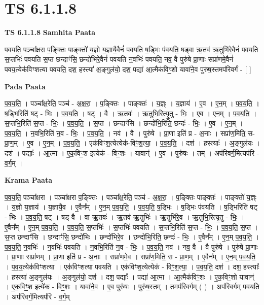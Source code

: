 \documentclass[17pt]{extarticle}
\begin{document}
\section{ TS 6.1.1.8 }

\textbf{TS 6.1.1.8 } \newline
\textbf{Samhita Paata} \newline

पवयति॒ पञ्चा᳚क्षरा प॒ङ्क्तिः पाङ्क्तो॑ य॒ज्ञो य॒ज्ञायै॒वैनं॑ पवयति ष॒ड्भिः प॑वयति॒ षड्वा ऋ॒तव॑ ऋ॒तुभि॑रे॒वैनं॑ पवयति स॒प्तभिः॑ पवयति स॒प्त छन्दाꣳ॑सि॒ छन्दो॑भिरे॒वैनं॑ पवयति न॒वभिः॑ पवयति॒ नव॒ वै पुरु॑षे प्रा॒णाः सप्रा॑णमे॒वैनं॑ पवय॒त्येक॑विꣳशत्या पवयति॒ दश॒ हस्त्या॑ अ॒ङ्गुल॑यो॒ दश॒ पद्या॑ आ॒त्मैक॑विꣳ॒॒शो यावा॑ने॒व पुरु॑ष॒स्तमप॑रिवर्गं - [  ] \newline

\textbf{Pada Paata} \newline

प॒व॒य॒ति॒ । पञ्चा᳚क्ष॒रेति॒ पञ्च॑ - अ॒क्ष॒रा॒ । प॒ङ्क्तिः । पाङ्क्तः॑ । य॒ज्ञ्ः । य॒ज्ञाय॑ । ए॒व । ए॒न॒म् । प॒व॒य॒ति॒ । ष॒ड्भिरिति॑ षट् - भिः । प॒व॒य॒ति॒ । षट् । वै । ऋ॒तवः॑ । ऋ॒तुभि॒रित्यृ॒तु - भिः॒ । ए॒व । ए॒न॒म् । प॒व॒य॒ति॒ । स॒प्तभि॒रिति॑ स॒प्त - भिः॒ । प॒व॒य॒ति॒ । स॒प्त । छन्दाꣳ॑सि । छन्दो॑भि॒रिति॒ छन्दः॑ - भिः॒ । ए॒व । ए॒न॒म् । प॒व॒य॒ति॒ । न॒वभि॒रिति॑ न॒व - भिः॒ । प॒व॒य॒ति॒ । नव॑ । वै । पुरु॑षे । प्रा॒णा इति॑ प्र - अ॒नाः । सप्रा॑ण॒मिति॒ स-प्रा॒ण॒म् । ए॒व । ए॒न॒म् । प॒व॒य॒ति॒ । एक॑विꣳश॒त्येत्येक॑-विꣳ॒॒श॒त्या॒ । प॒व॒य॒ति॒ । दश॑ । हस्त्याः᳚ । अ॒ङ्गुल॑यः । दश॑ । पद्याः᳚ । आ॒त्मा । ए॒क॒विꣳ॒॒श इत्येक॑ - विꣳ॒॒शः । यावान्॑ । ए॒व । पुरु॑षः । तम् । अप॑रिवर्ग॒मित्यप॑रि - व॒र्ग॒म् ।  \newline


\textbf{Krama Paata} \newline

प॒व॒य॒ति॒ पञ्चा᳚क्षरा । पञ्चा᳚क्षरा प॒ङ्‍क्तिः । पञ्चा᳚क्ष॒रेति॒ पञ्च॑ - अ॒क्ष॒रा॒ । प॒ङ्‍क्तिः पाङ्‍क्तः॑ । पाङ्‍क्तो॑ य॒ज्ञ्ः । य॒ज्ञो य॒ज्ञाय॑ । य॒ज्ञायै॒व । ए॒वैन᳚म् । ए॒न॒म् प॒व॒य॒ति॒ । प॒व॒य॒ति॒ ष॒ड्भिः । ष॒ड्भिः प॑वयति । ष॒ड्भिरिति॑ षट् - भिः । प॒व॒य॒ति॒ षट् । षड् वै । वा ऋ॒तवः॑ । ऋ॒तव॑ ऋ॒तुभिः॑ । ऋ॒तुभि॑रे॒व । ऋ॒तुभि॒रित्यृ॒तु - भिः॒ । ए॒वैन᳚म् । ए॒न॒म् प॒व॒य॒ति॒ । प॒व॒य॒ति॒ स॒प्तभिः॑ । स॒प्तभिः॑ पवयति । स॒प्तभि॒रिति॑ स॒प्त - भिः॒ । प॒व॒य॒ति॒ स॒प्त । स॒प्त छन्दाꣳ॑सि । छन्दाꣳ॑सि॒ छन्दो॑भिः । छन्दो॑भिरे॒व । छन्दो॑भि॒रिति॒ छन्दः॑ - भिः॒ । ए॒वैन᳚म् । ए॒न॒म् प॒व॒य॒ति॒ । प॒व॒य॒ति॒ न॒वभिः॑ । न॒वभिः॑ पवयति । न॒वभि॒रिति॑ न॒व - भिः॒ । प॒व॒य॒ति॒ नव॑ । नव॒ वै । वै पुरु॑षे । पुरु॑षे प्रा॒णाः । प्रा॒णाः सप्रा॑णम् । प्रा॒णा इति॑ प्र - अ॒नाः । सप्रा॑णमे॒व । सप्रा॑ण॒मिति॒ स - प्रा॒ण॒म् । ए॒वैन᳚म् । ए॒न॒म् प॒व॒य॒ति॒ । प॒व॒य॒त्येक॑विꣳशत्या । एक॑विꣳशत्या पवयति । एक॑विꣳश॒त्येत्येक॑ - विꣳ॒॒श॒त्या॒ । प॒व॒य॒ति॒ दश॑ । दश॒ हस्त्याः᳚ । हस्त्या॑ अ॒ङ्‍गुल॑यः । अ॒ङ्‍गुल॑यो॒ दश॑ । दश॒ पद्याः᳚ । पद्या॑ आ॒त्मा । आ॒त्मैक॑विꣳ॒॒शः । ए॒क॒विꣳ॒॒शो यावान्॑ । ए॒क॒विꣳ॒॒श इत्ये॑क - विꣳ॒॒शः । यावा॑ने॒व । ए॒व पुरु॑षः । पुरु॑ष॒स्तम् । तमप॑रिवर्गम् ( ) । अप॑रिवर्गम् पवयति । अप॑रिवर्ग॒मित्यप॑रि - व॒र्ग॒म् \newline
\end{document}
